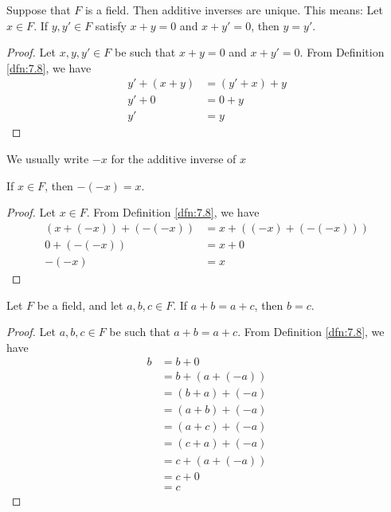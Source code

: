 \documentclass[../main.tex]{subfiles}
\begin{document}
\begin{theorem}\label{trm:7.10}
    Suppose that $F$ is a field. Then additive inverses are unique. This means: Let $x\in F$. If $y,y'\in F$ satisfy $x+y=0$ and $x+y'=0$, then $y=y'$.
    \begin{proof}
        Let $x,y,y'\in F$ be such that $x+y=0$ and $x+y'=0$. From Definition \ref{dfn:7.8}, we have
        \begin{align*}
            y'+(x+y) &= (y'+x)+y\tag*{FA2}\\
            y'+0 &= 0+y\tag*{FA4}\\
            y' &= y\tag*{FA3}
        \end{align*}
    \end{proof}
\end{theorem}

We usually write $-x$ for the additive inverse of $x$

\begin{corollary}\label{cly:7.11}
    If $x\in F$, then $-(-x)=x$.
    \begin{proof}
        Let $x\in F$. From Definition \ref{dfn:7.8}, we have
        \begin{align*}
            (x+(-x))+(-(-x)) &= x+((-x)+(-(-x)))\tag*{FA2}\\
            0+(-(-x)) &= x+0\tag*{FA4}\\
            -(-x) &= x\tag*{FA3}
        \end{align*}
    \end{proof}
\end{corollary}

\begin{corollary}\label{cly:7.12}
    Let $F$ be a field, and let $a,b,c\in F$. If $a+b=a+c$, then $b=c$.
    \begin{proof}
        Let $a,b,c\in F$ be such that $a+b=a+c$. From Definition \ref{dfn:7.8}, we have
        \begin{align*}
            b &= b+0\tag*{FA3}\\
            &= b+(a+(-a))\tag*{FA4}\\
            &= (b+a)+(-a)\tag*{FA2}\\
            &= (a+b)+(-a)\tag*{FA1}\\
            &= (a+c)+(-a)\tag*{Substitute}\\
            &= (c+a)+(-a)\tag*{FA1}\\
            &= c+(a+(-a))\tag*{FA2}\\
            &= c+0\tag*{FA4}\\
            &= c\tag*{FA3}
        \end{align*}
    \end{proof}
\end{corollary}
\end{document}
